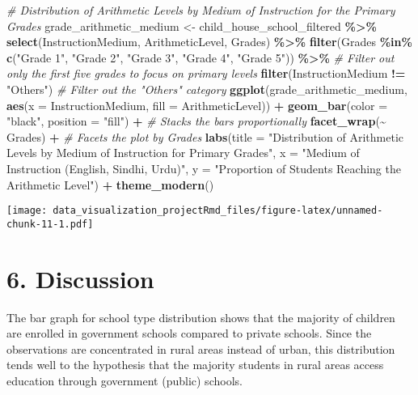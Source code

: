 \documentclass[
]{article}
\newenvironment{Shaded}{\begin{snugshade}}{\end{snugshade}}
\newcommand{\AttributeTok}[1]{\textcolor[rgb]{0.13,0.29,0.53}{#1}}
\newcommand{\CommentTok}[1]{\textcolor[rgb]{0.56,0.35,0.01}{\textit{#1}}}
\newcommand{\FunctionTok}[1]{\textcolor[rgb]{0.13,0.29,0.53}{\textbf{#1}}}
\newcommand{\NormalTok}[1]{#1}
\newcommand{\OtherTok}[1]{\textcolor[rgb]{0.56,0.35,0.01}{#1}}
\newcommand{\SpecialCharTok}[1]{\textcolor[rgb]{0.81,0.36,0.00}{\textbf{#1}}}
\newcommand{\StringTok}[1]{\textcolor[rgb]{0.31,0.60,0.02}{#1}}
\begin{document}
\begin{Shaded}
\begin{Highlighting}[]
\CommentTok{\# Distribution of Arithmetic Levels by Medium of Instruction for the Primary Grades}
\NormalTok{grade\_arithmetic\_medium }\OtherTok{\textless{}{-}}\NormalTok{ child\_house\_school\_filtered }\SpecialCharTok{\%\textgreater{}\%}
  \FunctionTok{select}\NormalTok{(InstructionMedium, ArithmeticLevel, Grades) }\SpecialCharTok{\%\textgreater{}\%}
  \FunctionTok{filter}\NormalTok{(Grades }\SpecialCharTok{\%in\%} \FunctionTok{c}\NormalTok{(}\StringTok{"Grade 1"}\NormalTok{, }\StringTok{"Grade 2"}\NormalTok{, }\StringTok{"Grade 3"}\NormalTok{, }\StringTok{"Grade 4"}\NormalTok{, }\StringTok{"Grade 5"}\NormalTok{)) }\SpecialCharTok{\%\textgreater{}\%}  \CommentTok{\# Filter out only the first five grades to focus on primary levels}
  \FunctionTok{filter}\NormalTok{(InstructionMedium }\SpecialCharTok{!=} \StringTok{"Others"}\NormalTok{)  }\CommentTok{\# Filter out the "Others" category}
\FunctionTok{ggplot}\NormalTok{(grade\_arithmetic\_medium, }\FunctionTok{aes}\NormalTok{(}\AttributeTok{x =}\NormalTok{ InstructionMedium, }\AttributeTok{fill =}\NormalTok{ ArithmeticLevel)) }\SpecialCharTok{+}
  \FunctionTok{geom\_bar}\NormalTok{(}\AttributeTok{color =} \StringTok{"black"}\NormalTok{, }\AttributeTok{position =} \StringTok{"fill"}\NormalTok{) }\SpecialCharTok{+}  \CommentTok{\# Stacks the bars proportionally}
  \FunctionTok{facet\_wrap}\NormalTok{(}\SpecialCharTok{\textasciitilde{}}\NormalTok{ Grades) }\SpecialCharTok{+}  \CommentTok{\# Facets the plot by Grades}
  \FunctionTok{labs}\NormalTok{(}\AttributeTok{title =} \StringTok{"Distribution of Arithmetic Levels by Medium of Instruction for Primary Grades"}\NormalTok{, }
       \AttributeTok{x =} \StringTok{"Medium of Instruction (English, Sindhi, Urdu)"}\NormalTok{, }
       \AttributeTok{y =} \StringTok{"Proportion of Students Reaching the Arithmetic Level"}\NormalTok{) }\SpecialCharTok{+}
  \FunctionTok{theme\_modern}\NormalTok{()}
\end{Highlighting}
\end{Shaded}

\texttt{[image: data\_visualization\_projectRmd\_files/figure-latex/unnamed-chunk-11-1.pdf]}

\section{6. Discussion}\label{discussion}

The bar graph for school type distribution shows that the majority of
children are enrolled in government schools compared to private schools.
Since the observations are concentrated in rural areas instead of urban,
this distribution tends well to the hypothesis that the majority
students in rural areas access education through government (public)
schools.
\end{document}
